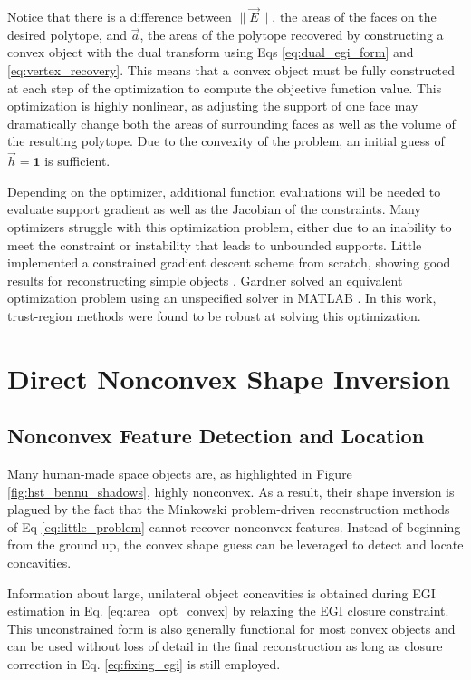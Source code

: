 Notice that there is a difference between $ \| \vec{E} \| $, the areas of the faces on the desired polytope, and $\vec{a}$, the areas of the polytope recovered by constructing a convex object with the dual transform using Eqs \ref{eq:dual_egi_form} and \ref{eq:vertex_recovery}. This means that a convex object must be fully constructed at each step of the optimization to compute the objective function value. This optimization is highly nonlinear, as adjusting the support of one face may dramatically change both the areas of surrounding faces as well as the volume of the resulting polytope. Due to the convexity of the problem, an initial guess of $\vec{h} = \mathbf{1}$ is sufficient.

Depending on the optimizer, additional function evaluations will be needed to evaluate support gradient as well as the Jacobian of the constraints. Many optimizers struggle with this optimization problem, either due to an inability to meet the constraint or instability that leads to unbounded supports. Little implemented a constrained gradient descent scheme from scratch, showing good results for reconstructing simple objects \cite{little1983}. Gardner solved an equivalent optimization problem using an unspecified solver in MATLAB \cite{gardner2003}. In this work, trust-region methods \cite{conn2000} were found to be robust at solving this optimization.

\section{Direct Nonconvex Shape Inversion}

\subsection{Nonconvex Feature Detection and Location}

Many human-made space objects are, as highlighted in Figure \ref{fig:hst_bennu_shadows}, highly nonconvex. As a result, their shape inversion is plagued by the fact that the Minkowski problem-driven reconstruction methods of Eq \ref{eq:little_problem} cannot recover nonconvex features. Instead of beginning from the ground up, the convex shape guess can be leveraged to detect and locate concavities.

Information about large, unilateral object concavities is obtained during EGI estimation in Eq. \ref{eq:area_opt_convex} by relaxing the EGI closure constraint. This unconstrained form is also generally functional for most convex objects and can be used without loss of detail in the final reconstruction as long as closure correction in Eq. \ref{eq:fixing_egi} is still employed.

